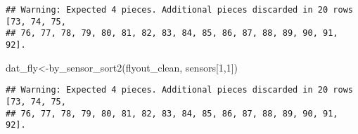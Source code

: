 \documentclass[
]{article}
\newenvironment{Shaded}{\begin{snugshade}}{\end{snugshade}}
\newcommand{\DecValTok}[1]{\textcolor[rgb]{0.00,0.00,0.81}{#1}}
\newcommand{\FunctionTok}[1]{\textcolor[rgb]{0.00,0.00,0.00}{#1}}
\newcommand{\NormalTok}[1]{#1}
\newcommand{\OtherTok}[1]{\textcolor[rgb]{0.56,0.35,0.01}{#1}}
\begin{document}
\begin{verbatim}
## Warning: Expected 4 pieces. Additional pieces discarded in 20 rows [73, 74, 75,
## 76, 77, 78, 79, 80, 81, 82, 83, 84, 85, 86, 87, 88, 89, 90, 91, 92].
\end{verbatim}

\begin{Shaded}
\begin{Highlighting}[]
\NormalTok{dat\_fly}\OtherTok{\textless{}{-}}\FunctionTok{by\_sensor\_sort2}\NormalTok{(flyout\_clean, sensors[}\DecValTok{1}\NormalTok{,}\DecValTok{1}\NormalTok{])}
\end{Highlighting}
\end{Shaded}

\begin{verbatim}
## Warning: Expected 4 pieces. Additional pieces discarded in 20 rows [73, 74, 75,
## 76, 77, 78, 79, 80, 81, 82, 83, 84, 85, 86, 87, 88, 89, 90, 91, 92].
\end{verbatim}
\end{document}
